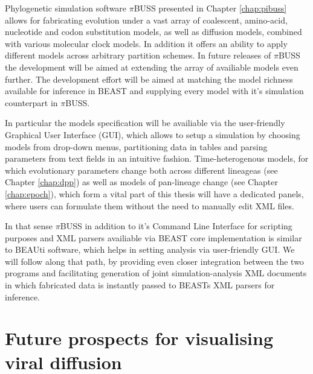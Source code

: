 Phylogenetic simulation software $\pi$BUSS presented in Chapter \ref{chap:pibuss} allows for fabricating evolution under a vast array of coalescent, amino-acid, nucleotide and codon substitution models, as well as diffusion models, combined with various molecular clock models.
In addition it offers an ability to apply different models across arbitrary partition schemes.
In future releases of $\pi$BUSS the development will be aimed at extending the array of availiable models even further.
The development effort will be aimed at matching the model richness available for inference in BEAST and supplying every model with it's simulation counterpart in $\pi$BUSS.

In particular the models specification will be availiable via the user-friendly Graphical User Interface (GUI), which allows to setup a simulation by choosing models from drop-down menus, partitioning data in tables and parsing parameters from text fields in an intuitive fashion.
Time-heterogenous models, for which evolutionary parameters change both across different lineageas (see Chapter \ref{chap:dpp}) as well as models of pan-lineage change (see Chapter \ref{chap:epoch}), which form a vital part of this thesis will have a dedicated panels, where users can formulate them without the need to manually edit XML files.

In that sense $\pi$BUSS in addition to it's Command Line Interface for scripting purposes and XML parsers availiable via BEAST core implementation is similar to BEAUti software, which helps in setting analysis via user-friendly GUI.
We will follow along that path, by providing even closer integration between the two programs and facilitating generation of joint simulation-analysis XML documents in which fabricated data is instantly passed to BEASTs XML parsers for inference.

\section{Future prospects for visualising viral diffusion}

















